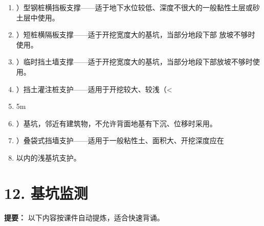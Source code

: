 \documentclass[UTF8,fontset=fandol,11pt]{ctexart}
\begin{document}
\begin{enumerate}[label=\arabic*.]
\item ）型钢桩横挡板支撑——适于地下水位较低、深度不很大的一般黏性土层或砂土层中使用。

\item ）短桩横隔板支撑——适于开挖宽度大的基坑，当部分地段下部 放坡不够时使用。

\item ）临时挡土墙支撑——适于开挖宽度大的基坑，当部分地段下部放坡不够时使用。

\item ）挡土灌注桩支护——适用于开挖较大、较浅（<

\item 5m

\item ）基坑，邻近有建筑物，不允许背面地基有下沉、位移时采用。

\item ）叠袋式挡墙支护——适用于一般粘性土、面积大、开挖深度应在

\item 以内的浅基坑支护。

\end{enumerate}

\newpage

\section*{12. 基坑监测}


\begin{mainbox}

\textbf{提要：} 以下内容按课件自动提炼，适合快速背诵。

\end{mainbox}
\end{document}
